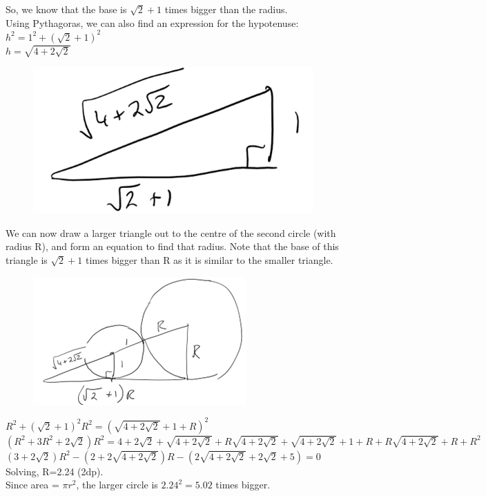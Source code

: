 \documentclass[../main.tex]{subfiles}
\begin{document}
\begin{enumerate}
    So, we know that the base is \(\sqrt{2}+1\) times bigger than the radius.\\
    Using Pythagoras, we can also find an expression for the hypotenuse:\\
    \(h^2=1^2+(\sqrt{2}+1)^2\)\\
    \(h=\sqrt{4+2\sqrt{2}}\)\\
    \begin{figure}[H]
        \centering
        \includegraphics[width=0.25\linewidth]{images/t1w8q3_ans4.png}
    \end{figure}
    We can now draw a larger triangle out to the centre of the second circle (with radius R), and form an equation to find that radius. Note that the base of this triangle is \(\sqrt{2}+1\) times bigger than R as it is similar to the smaller triangle.
    \begin{figure}[H]
        \centering
        \includegraphics{images/t1w8q3_ans5.png}
    \end{figure}
    \(R^2+(\sqrt{2}+1)^2 R^2=(\sqrt{4+2\sqrt{2}}+1+R)^2\)\\
    
\((R^2+3R^2+2\sqrt{2})R^2=4+2\sqrt{2}+\sqrt{4+2\sqrt{2}}+R\sqrt{4+2\sqrt{2}}+\sqrt{4+2\sqrt{2}}+1+R+R\sqrt{4+2\sqrt{2}}+R+R^2
    \)\\
    
    \((3+2\sqrt{2})R^2-(2+2\sqrt{4+2\sqrt{2}})R-(2\sqrt{4+2\sqrt{2}}+2\sqrt{2}+5)=0\)\\
    
    Solving, R=2.24 (2dp).\\
    Since area = \(\pi r^2\), the larger circle is \(2.24^2=5.02\) times bigger.\\

    
\end{enumerate}
\end{document}
